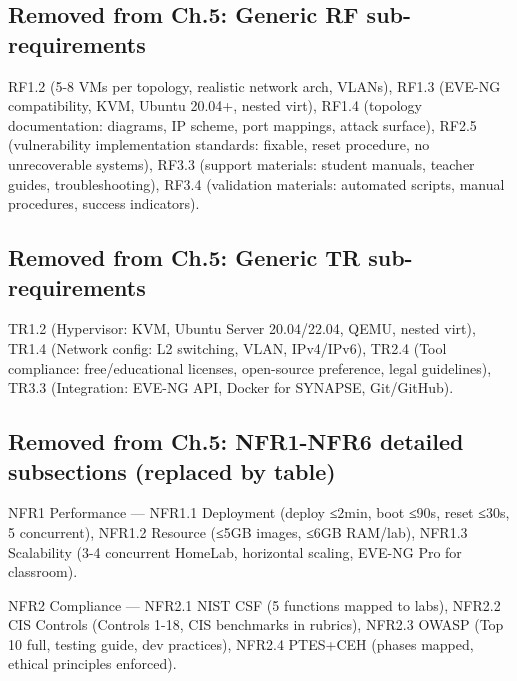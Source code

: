 \documentclass[a4paper,11pt]{article}
\begin{document}
\subsection{Removed from Ch.5: Generic RF sub-requirements}


RF1.2 (5-8 VMs per topology, realistic network arch, VLANs),
RF1.3 (EVE-NG compatibility, KVM, Ubuntu 20.04+, nested virt),
RF1.4 (topology documentation: diagrams, IP scheme, port mappings, attack surface),
RF2.5 (vulnerability implementation standards: fixable, reset procedure, no unrecoverable systems),
RF3.3 (support materials: student manuals, teacher guides, troubleshooting),
RF3.4 (validation materials: automated scripts, manual procedures, success indicators).

\subsection{Removed from Ch.5: Generic TR sub-requirements}


TR1.2 (Hypervisor: KVM, Ubuntu Server 20.04/22.04, QEMU, nested virt),
TR1.4 (Network config: L2 switching, VLAN, IPv4/IPv6),
TR2.4 (Tool compliance: free/educational licenses, open-source preference, legal guidelines),
TR3.3 (Integration: EVE-NG API, Docker for SYNAPSE, Git/GitHub).

\subsection{Removed from Ch.5: NFR1-NFR6 detailed subsections (replaced by table)}


NFR1 Performance --- NFR1.1 Deployment (deploy ≤2min, boot ≤90s, reset ≤30s, 5 concurrent),
NFR1.2 Resource (≤5GB images, ≤6GB RAM/lab), NFR1.3 Scalability (3-4 concurrent HomeLab,
horizontal scaling, EVE-NG Pro for classroom).

NFR2 Compliance --- NFR2.1 NIST CSF (5 functions mapped to labs), NFR2.2 CIS Controls
(Controls 1-18, CIS benchmarks in rubrics), NFR2.3 OWASP (Top 10 full, testing guide,
dev practices), NFR2.4 PTES+CEH (phases mapped, ethical principles enforced).
\end{document}
